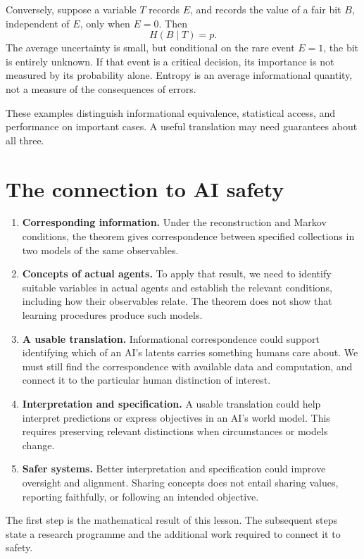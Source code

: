 \documentclass[10pt]{article}
\begin{document}
Conversely, suppose a variable $T$ records $E$, and records the value of a fair
bit $B$, independent of $E$, only when $E=0$. Then
\[
 H(B\mid T)=p.
\]
The average uncertainty is small, but conditional on the rare event $E=1$, the
bit is entirely unknown. If that event is a critical decision, its importance
is not measured by its probability alone. Entropy is an average informational
quantity, not a measure of the consequences of errors.

These examples distinguish informational equivalence, statistical access, and
performance on important cases. A useful translation may need guarantees about
all three.

\section{The connection to AI safety}
\begin{enumerate}
\item \textbf{Corresponding information.} Under the reconstruction and Markov
conditions, the theorem gives correspondence between specified collections in
two models of the same observables.
\item \textbf{Concepts of actual agents.} To apply that result, we need to
identify suitable variables in actual agents and establish the relevant
conditions, including how their observables relate. The theorem does not show
that learning procedures produce such models.
\item \textbf{A usable translation.} Informational correspondence could support
identifying which of an AI's latents carries something humans care about. We
must still find
the correspondence with available data and computation, and connect it to the
particular human distinction of interest.
\item \textbf{Interpretation and specification.} A usable translation could help
interpret predictions or express objectives in an AI's world model. This requires
preserving relevant distinctions when circumstances or models change.
\item \textbf{Safer systems.} Better interpretation and specification could improve
oversight and alignment. Sharing concepts does not entail sharing values,
reporting faithfully, or following an intended objective.
\end{enumerate}
The first step is the mathematical result of this lesson. The subsequent steps
state a research programme and the additional work required to connect it to
safety.
\end{document}
